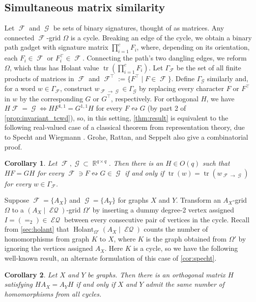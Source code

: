 \documentclass{article}
\newtheorem{corollary}{Corollary}[section]
\theoremstyle{remark}
\theoremstyle{definition}
\DeclareMathOperator{\tr}{tr}
\DeclareMathOperator{\rr}{\mathbb{R}}
\DeclareMathOperator{\fc}{\mathcal{F}}
\DeclareMathOperator{\gc}{\mathcal{G}}
\DeclareMathOperator{\holant}{Holant}
\DeclareMathOperator{\eq}{\mathcal{EQ}}
\begin{document}
\subsection{Simultaneous matrix similarity}
Let $\fc$ and $\gc$ be sets of binary signatures, thought of as matrices. Any connected $\fc$-grid
$\Omega$
is a cycle. Breaking an edge of the cycle, we obtain a binary path gadget with signature matrix
$\prod_{i=1}^c F_i$, where, depending on its orientation, each $F_i \in \fc$ or $F_i^\top \in \fc$.
Connecting the path's two dangling edges, we reform $\Omega$, which thus has Holant value
$\tr\left(\prod_{i=1}^c F_i\right)$. Let $\Gamma_{\fc}$ be the set of all finite products of
matrices in $\fc$ and $\fc^\top := \{F^\top \mid F \in \fc\}$. Define $\Gamma_{\gc}$ similarly and,
for a word $w \in \Gamma_{\fc}$, construct $w_{\fc\to\gc} \in \Gamma_{\gc}$ by replacing every character
$F$ or $F^\top$ in $w$ by the corresponding $G$ or $G^\top$, respectively. 
For orthogonal $H$, we have $H\fc = \gc \iff HF^{1,1} = G^{1,1}H$ for every $F \leftrightsquigarrow G$
(by part 2 of \autoref{prop:invariant_tcwd}), so, in this
setting, \autoref{thm:result} is equivalent to the following real-valued case of a
classical theorem from representation theory, due to Specht \cite{specht} and Wiegmann \cite{wiegmann}.
Grohe, Rattan, and Seppelt \cite{grohe_homomorphism_2022} also give a combinatorial proof.
\begin{corollary}
    Let $\fc, \gc \subset \rr^{q\times q}$. Then there is an $H \in O(q)$ such that $HF = GH$ for every
    $\fc \ni F \leftrightsquigarrow G \in \gc$ if and only if
    $\tr(w) = \tr(w_{\fc\to\gc})$ for every $w \in \Gamma_{\fc}$.
    \label{cor:specht}
\end{corollary}

Suppose $\fc = \{A_X\}$ and $\gc = \{A_Y\}$ for graphs $X$ and $Y$.
Transform an
$A_X$-grid $\Omega$ to a $(A_X \mid \eq)$-grid $\Omega'$ by inserting a dummy degree-2 vertex assigned 
$I = (=_2) \in \eq$ between every consecutive pair of vertices in the cycle. Recall from
\autoref{sec:holant} that
$\holant_{\Omega'}(A_X \mid \eq)$ counts the number of homomorphisms from graph $K$ to $X$, where $K$ is the graph obtained from $\Omega'$ by ignoring the vertices assigned $A_X$. Here
$K$ is a cycle, so we have the following well-known result, an alternate formulation
of this case of \autoref{cor:specht}.
\begin{corollary}
    Let $X$ and $Y$ be graphs. Then there is an orthogonal matrix $H$ satisfying $H A_X = A_Y H$
    if and only if $X$ and $Y$ admit the same number of homomorphisms from all cycles.
    \label{cor:cycle}
\end{corollary}
\end{document}
